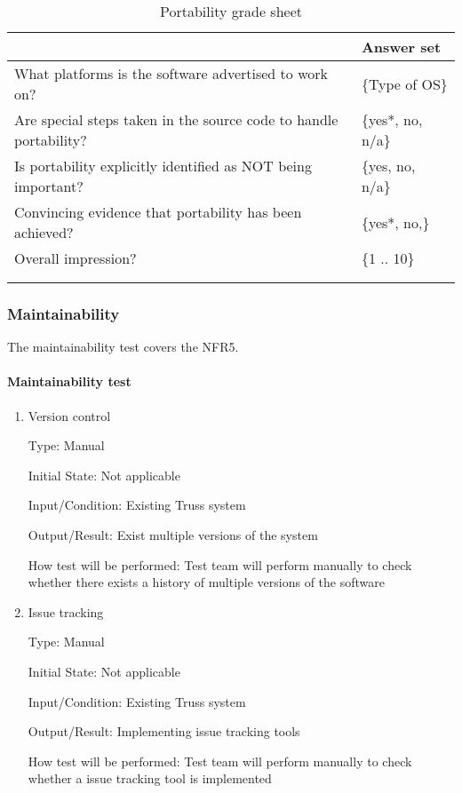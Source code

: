 \documentclass[12pt, titlepage]{article}
\begin{document}
\begin{enumerate}
	\begin{longtable}{l l}
		\begin{tabular}{l l} 
			\toprule		
			\textbf{Questions} & \textbf{Answer set}\\
			\midrule 
			What platforms is the software advertised to work on? & \{Type of 
			OS\}\\
			Are special steps taken in the source code to handle portability? & 
			\{yes*, no, n/a\}\\
			Is portability explicitly identified as NOT being important? & 
			\{yes, no, n/a\} \\
			Convincing evidence that portability has been achieved? & 
			\{yes*, no,\} \\		
			Overall impression? & \{1 .. 10\} \\
			\bottomrule
			\caption{Portability grade sheet} \label{Porgradesheet} \\
		\end{tabular}\\
	\end{longtable}

\end{enumerate}

\subsubsection{Maintainability} \label{main}
The maintainability test covers the NFR5.
\paragraph{Maintainability test}

\begin{enumerate}
	
	\item{Version control\\}
	
	Type: Manual
	
	Initial State: Not applicable
	
	Input/Condition: Existing Truss system
	
	Output/Result: Exist multiple versions of the system
	
	How test will be performed: Test team will perform manually to 
	check whether there exists a history of multiple versions of the software
	
	\item{Issue tracking\\}
	
	Type: Manual
	
	Initial State: Not applicable
	
	Input/Condition: Existing Truss system
	
	Output/Result: Implementing issue tracking tools
	
	How test will be performed:  Test team will perform manually to 
	check whether a issue tracking tool is implemented
	
\end{enumerate}
\end{document}
